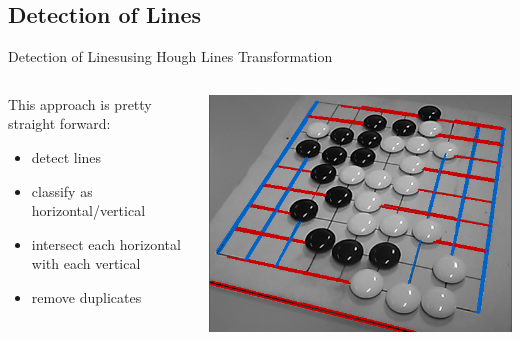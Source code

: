 \documentclass[table]{beamer}
\begin{document}
\subsection{Detection of Lines}
\begin{frame}{Detection of Lines}{using Hough Lines Transformation}
	\begin{columns}
		\begin{column}{0.5\textwidth}
			This approach is pretty straight forward:
			\begin{itemize}
				\item detect lines
				\item classify as horizontal/vertical
				\item intersect each horizontal with each vertical
				\item remove duplicates
			\end{itemize}
		\end{column}

		\begin{column}{0.45\textwidth}
			\includegraphics[width=\columnwidth]{images/lineDetection_hough.png}
		\end{column}
	\end{columns}
\end{frame}
\end{document}
